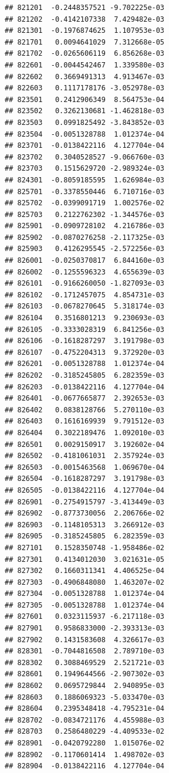 \begin{frame}[fragile]
\begin{verbatim}
## 821201  -0.2448357521 -9.702225e-03
## 821202  -0.4142107338  7.429482e-03
## 821301  -0.1976874625  1.107953e-03
## 821701   0.0094641029  7.312668e-05
## 821702  -0.0265606119  6.856268e-03
## 822601  -0.0044542467  1.339580e-03
## 822602   0.3669491313  4.913467e-03
## 822603   0.1117178176 -3.052978e-03
## 823501   0.2412906349  8.564753e-04
## 823502   0.3262130681 -1.462818e-03
## 823503   0.0991825492 -3.843852e-03
## 823504  -0.0051328788  1.012374e-04
## 823701  -0.0138422116  4.127704e-04
## 823702   0.3040528527 -9.066760e-03
## 823703   0.1515629720 -2.989324e-03
## 824301  -0.8059185595  1.626984e-03
## 825701  -0.3378550446  6.710716e-03
## 825702  -0.0399091719  1.002576e-02
## 825703   0.2122762302 -1.344576e-03
## 825901  -0.0909728102  4.216786e-03
## 825902  -0.0870276258 -2.117325e-03
## 825903   0.4126295545 -2.572256e-03
## 826001  -0.0250370817  6.844160e-03
## 826002  -0.1255596323  4.655639e-03
## 826101  -0.9166260050 -1.827093e-03
## 826102  -0.1712457075  4.854731e-03
## 826103  -0.0678270645  5.318174e-03
## 826104   0.3516801213  9.230693e-03
## 826105  -0.3333028319  6.841256e-03
## 826106  -0.1618287297  3.191798e-03
## 826107  -0.4752204313  9.372920e-03
## 826201  -0.0051328788  1.012374e-04
## 826202  -0.3185245805  6.282359e-03
## 826203  -0.0138422116  4.127704e-04
## 826401  -0.0677665877  2.392653e-03
## 826402   0.0838128766  5.270110e-03
## 826403   0.1616169939  9.791512e-03
## 826404   0.3022189476  1.092010e-03
## 826501   0.0029150917  3.192602e-04
## 826502  -0.4181061031  2.357924e-03
## 826503  -0.0015463568  1.069670e-04
## 826504  -0.1618287297  3.191798e-03
## 826505  -0.0138422116  4.127704e-04
## 826901  -0.2754915797 -3.413449e-03
## 826902  -0.8773730056  2.206766e-02
## 826903  -0.1148105313  3.266912e-03
## 826905  -0.3185245805  6.282359e-03
## 827101   0.1528350748 -1.958486e-02
## 827301   0.4134012030  3.021631e-05
## 827302   0.1660311341  4.406525e-04
## 827303  -0.4906848080  1.463207e-02
## 827304  -0.0051328788  1.012374e-04
## 827305  -0.0051328788  1.012374e-04
## 827601   0.0323115937 -6.217118e-03
## 827901   0.9586833000 -2.393313e-03
## 827902   0.1431583608  4.326617e-03
## 828301  -0.7044816508  2.789710e-03
## 828302   0.3088469529  2.521721e-03
## 828601   0.1949644566 -2.907302e-03
## 828602   0.0695729844  2.940895e-03
## 828603   0.1886069323 -5.033470e-03
## 828604   0.2395348418 -4.795231e-04
## 828702  -0.0834721176  4.455988e-03
## 828703   0.2586480229 -4.409533e-02
## 828901  -0.0420792280  1.015076e-02
## 828902  -0.1170601414  1.498702e-03
## 828904  -0.0138422116  4.127704e-04

\end{verbatim}
\end{frame}
